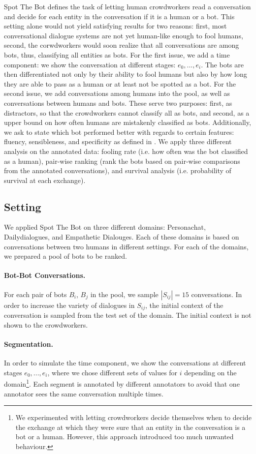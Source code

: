 \documentclass[11pt,a4paper]{article}
\begin{document}
Spot The Bot defines the task of letting human crowdworkers read a conversation and decide for each entity in the conversation if it is a human or a bot. This setting alone would not yield satisfying results for two reasons: first, most conversational dialogue systems are not yet human-like enough to fool humans, second, the corwdworkers would soon realize that all conversations are among bots, thus, classifying all entities as bots. 
For the first issue, we add a time component: we show the conversation at different stages: $e_0, ..., e_i$. The bots are then differentiated not only by their ability to fool humans but also by how long they are able to pass as a human or at least not be spotted as a bot. For the second issue, we add conversations among humans into the pool, as well as conversations between humans and bots. These serve two purposes: first, as distractors, so that the crowdworkers cannot classify all as bots, and second, as a upper bound on how often humans are mistakenly classified as bots.
Additionally, we ask to state which bot performed better with regards to certain features: fluency, sensibleness, and specificity as defined in \cite{}. 
We apply three different analysis on the annotated data: fooling rate (i.e. how often was the bot classified as a human), pair-wise ranking (rank the bots based on pair-wise comparisons from the annotated conversations), and survival analysis (i.e. probability of survival at each exchange).

\subsection{Setting}
We applied Spot The Bot on three different domains: Personachat, Dailydialogues, and Empathetic Dialouges. Each of these domains is based on conversations between two humans in different settings. For each of the domains, we prepared a pool of bots to be ranked. 


\paragraph{Bot-Bot Conversations.} For each pair of bots $B_i$, $B_j$ in the pool, we sample $|S_{ij}| = 15$ conversations. In order to increase the variety of dialogues in $S_{ij}$, the initial context of the conversation is sampled from the test set of the domain. The initial context is not shown to the crowdworkers. 
\paragraph{Segmentation.} In order to simulate the time component, we show the conversations at different stages $e_0, ..., e_i$, where we chose different sets of values for $i$ depending on the domain\footnote{We experimented with letting crowdworkers decide themselves when to decide the exchange at which they were sure that an entity in the conversation is a bot or a human. However, this approach introduced too much unwanted behaviour.}. Each segment is annotated by different annotators to avoid that one annotator sees the same conversation multiple times. 
\end{document}
